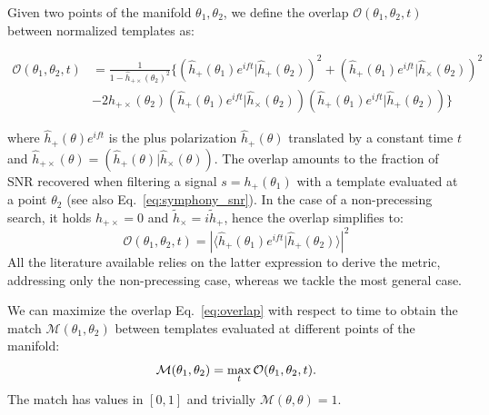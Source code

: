 \documentclass[twocolumn,showpacs,preprintnumbers,nofootinbib,prd,
superscriptaddress,10pt]{revtex4-2}
\newcommand{\scalar}[2]{\langle #1|#2 \rangle}
\newcommand{\rescalar}[2]{( #1 |#2 )}
\newcommand{\rescalarwide}[2]{\left( #1 \lvert #2 \right)}
\begin{document}
Given two points of the manifold $\theta_1,\theta_2$, we define the overlap $\mathcal{O}(\theta_1,\theta_2, t)$ between normalized templates as:
\begin{widetext}
	\begin{align}\label{eq:overlap}
		\mathcal{O}(\theta_1,\theta_2, t) &= \frac{1}{1- \hat{h}_{+\times}(\theta_2)^2} 
		\biggl\{ \rescalarwide{\hat{h}_+(\theta_1)e^{i ft}}{\hat{h}_+(\theta_2)}^2 + \rescalarwide{\hat{h}_+(\theta_1)e^{i ft}}{\hat{h}_\times(\theta_2)}^2 \nonumber \\
		& -2h_{+\times}(\theta_2)\rescalarwide{\hat{h}_+(\theta_1)e^{i ft}}{\hat{h}_\times(\theta_2)}\rescalarwide{\hat{h}_+(\theta_1)e^{i ft}}{\hat{h}_+(\theta_2)} \biggl\}
	\end{align}
\end{widetext}
where $\hat{h}_+(\theta)e^{i ft}$ is the plus polarization $\hat{h}_+(\theta)$ translated by a constant time $t$ and $\hat{h}_{+\times}(\theta) = \rescalar{\hat{h}_+(\theta)}{\hat{h}_\times(\theta)}$.
The overlap amounts to the fraction of SNR recovered when filtering a signal $s=h_+(\theta_1)$ with a template evaluated at a point $\theta_2$ (see also Eq.~\eqref{eq:symphony_snr}).
In the case of a non-precessing search, it holds $h_{+\times} = 0$ and $\tilde{h}_\times = i \tilde{h}_+$, hence the overlap simplifies to:
\begin{equation}\label{eq:overlap_NP}
\mathcal{O}(\theta_1,\theta_2, t) = \left|\scalar{\hat{h}_+(\theta_1)e^{i ft}}{\hat{h}_+(\theta_2)} \right|^2
\end{equation}
All the literature available \cite{owen_metric, Messenger:2008ta, Prix:2007ks, Brown:2012qf, Roy:2017oul, Coogan:2022qxs, Hanna:2022zpk} relies on the latter expression to derive the metric, addressing only the non-precessing case, whereas we tackle the most general case.

We can maximize the overlap Eq.~\eqref{eq:overlap} with respect to time to obtain the match $\mathcal{M}(\theta_1,\theta_2)$ between templates evaluated at different points of the manifold:
\begin{equation}\label{eq:match}
	\mathcal{M}(\theta_1,\theta_2) = \max_t \mathcal{O}(\theta_1,\theta_2, t). \\
\end{equation}
%
The match has values in $[0,1]$ and trivially $\mathcal{M}(\theta,\theta) = 1$.
\end{document}
